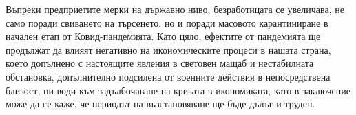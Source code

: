 \documentclass[a4paper,12pt]{article}
\begin{document}
Въпреки предприетите мерки на държавно ниво, безработицата се увеличава, не само поради свиването на търсенето, но и поради масовото карантиниране в начален етап от Ковид-пандемията. Като цяло, ефектите от пандемията ще продължат да влияят негативно на икономическите процеси в нашата страна, което допълнено с настоящите явления в световен мащаб и нестабилната обстановка, допълнително подсилена от военните действия в непосредствена близост, ни води към задълбочаване на кризата в икономиката, като в заключение може да се каже, че периодът на възстановяване ще бъде дълъг и труден.



\end{document}
